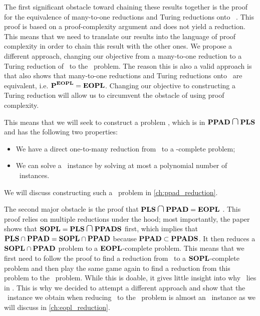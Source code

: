 The first significant obstacle toward chaining these results together is the proof for the equivalence of many-to-one reductions and Turing reductions onto \PPAD\ . This proof is based on a proof-complexity argument and does not yield a reduction. This means that we need to translate our results into the language of proof complexity in order to chain this result with the other ones. We propose a different approach, changing our objective from a many-to-one reduction to a Turing reduction of \Tarski\ to the \EndOfPotentialLine\ problem. The reason this is also a valid approach is that  also shows that many-to-one reductions and Turing reductions onto \EOPL\ are equivalent, i.e. $\textbf{P}^{\textbf{EOPL}} = \textbf{EOPL}$. Changing our objective to constructing a Turing reduction will allow us to circumvent the obstacle of using proof complexity.

This means that we will seek to construct a problem \Tarskistar, which is in $\PPAD  \medcap \PLS$ and has the following two properties:
\begin{itemize}
	\item We have a direct one-to-many reduction from \Tarskistar\ to a \PPAD-complete problem;
	\item We can solve a \Tarski\ instance by solving at most a polynomial number of \Tarskistar\ instances.
\end{itemize}
We will discuss constructing such a \Tarskistar\ problem in \cref{ch:ppad_reduction}.

The second major obstacle is the proof that $\PLS \medcap \PPAD = \EOPL$ . This proof relies on multiple reductions under the hood; most importantly, the paper shows that $\SOPL = \PLS \medcap \PPADS$ first, which implies that $\textbf{PLS} \cap \textbf{PPAD} =  \textbf{SOPL} \cap \textbf{PPAD}$ because $\textbf{PPAD} \subset \textbf{PPADS}$. It then reduces a $\textbf{SOPL} \cap \textbf{PPAD}$ problem to a $\textbf{EOPL}$-complete problem. This means that we first need to follow the proof to find a reduction from \Tarskistar\ to a $\textbf{SOPL}$-complete problem and then play the same game again to find a reduction from this problem to the \EndOfPotentialLine\ problem. While this is doable, it gives little insight into why \Tarski\ lies in \EOPL\@. This is why we decided to attempt a different approach and show that the \EndOfLine\ instance we obtain when reducing \Tarskistar\ to the \EndOfLine\ problem is almost an \EndOfPotentialLine\ instance as we will discuss in \cref{ch:eopl_reduction}.